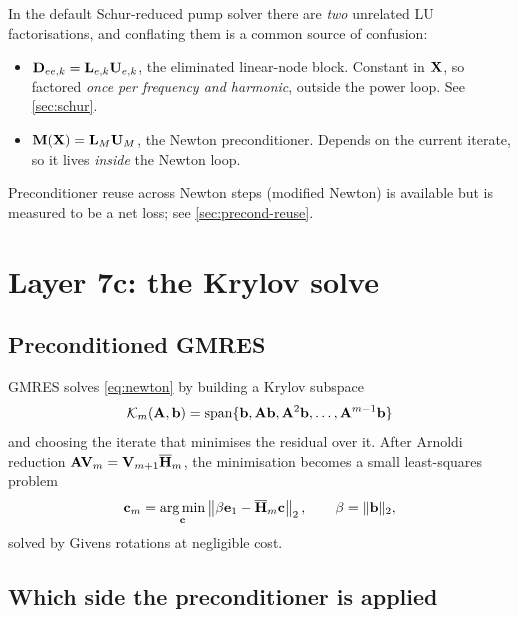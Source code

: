 \begin{remark}
\label{rem:two-lus}
In the default Schur-reduced pump solver there are \emph{two} unrelated LU
factorisations, and conflating them is a common source of confusion:
\begin{itemize}
\item $\mathbf{D}_{ee,k} = \mathbf{L}_{e,k}\mathbf{U}_{e,k}$, the eliminated linear-node
      block. Constant in $\mathbf{X}$, so factored \emph{once per frequency and
      harmonic}, outside the power loop. See \cref{sec:schur}.
\item $\mathbf{M}(\mathbf{X}) = \mathbf{L}_M\mathbf{U}_M$, the Newton preconditioner. Depends
      on the current iterate, so it lives \emph{inside} the Newton loop.
\end{itemize}
\end{remark}

Preconditioner reuse across Newton steps (modified Newton) is available but is
measured to be a net loss; see \cref{sec:precond-reuse}.

\section{Layer 7c: the Krylov solve}
\label{sec:gmres}

\subsection{Preconditioned GMRES}

GMRES solves \eqref{eq:newton} by building a Krylov subspace
\begin{equation}
  \mathcal{K}_m(\mathbf{A},\mathbf{b})
  = \operatorname{span}\{\mathbf{b},\mathbf{A}\mathbf{b},\mathbf{A}^{2}\mathbf{b},\dots,
             \mathbf{A}^{m-1}\mathbf{b}\}
\end{equation}
and choosing the iterate that minimises the residual over it. After Arnoldi
reduction $\mathbf{A}\mathbf{V}_m = \mathbf{V}_{m+1}\overline{\mathbf{H}}_m$, the
minimisation becomes a small least-squares problem
\begin{equation}
  \mathbf{c}_m = \operatorname*{arg\,min}_{\mathbf{c}}
  \left\|\beta\mathbf{e}_1 - \overline{\mathbf{H}}_m\mathbf{c}\right\|_2 ,
  \qquad \beta = \|\mathbf{b}\|_2 ,
\end{equation}
solved by Givens rotations at negligible cost.

\subsection{Which side the preconditioner is applied}

